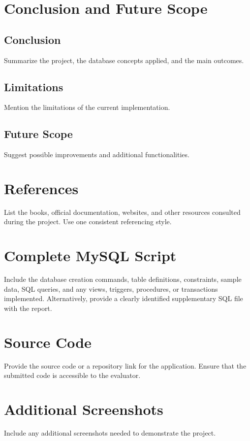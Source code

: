 \documentclass[12pt,a4paper]{report}
\begin{document}
\chapter{Conclusion and Future Scope}

\section{Conclusion}
Summarize the project, the database concepts applied, and the main outcomes.

\section{Limitations}
Mention the limitations of the current implementation.

\section{Future Scope}
Suggest possible improvements and additional functionalities.

\chapter*{References}
List the books, official documentation, websites, and other resources consulted during the project. Use one consistent referencing style.

\appendix

\chapter{Complete MySQL Script}
Include the database creation commands, table definitions, constraints, sample data, SQL queries, and any views, triggers, procedures, or transactions implemented. Alternatively, provide a clearly identified supplementary SQL file with the report.

\chapter{Source Code}
Provide the source code or a repository link for the application. Ensure that the submitted code is accessible to the evaluator.

\chapter{Additional Screenshots}
Include any additional screenshots needed to demonstrate the project.
\end{document}
